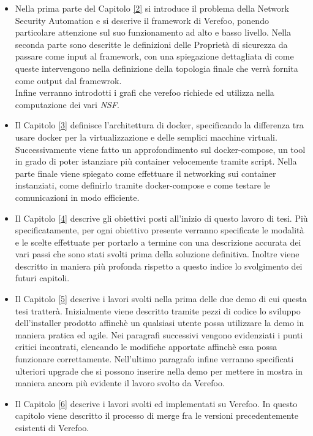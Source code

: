 \begin{itemize}
    \item Nella prima parte del Capitolo \hyperref[ch:verefoo]{[2]} si introduce il problema della Network Security Automation e si descrive il framework di Verefoo, ponendo particolare attenzione sul suo funzionamento ad alto e basso livello.
        Nella seconda parte sono descritte  le  definizioni delle Proprietà di sicurezza da passare come input al framework, con una spiegazione dettagliata
        di come queste intervengono nella definizione della topologia finale che verrà fornita come output dal framewrok. \\
        Infine verranno introdotti i grafi che verefoo richiede ed utilizza nella computazione dei vari \textit{NSF}.
    \item Il Capitolo \hyperref[ch:docker]{[3]} definisce l'architettura di docker, specificando la differenza tra usare docker per la virtualizzazione e delle semplici macchine virtuali. Successivamente
          viene fatto un approfondimento sul docker-compose, un tool in grado di poter istanziare più container velocemente tramite script. Nella parte finale viene spiegato come effettuare il networking
          sui container instanziati, come definirlo tramite docker-compose e come testare le comunicazioni in modo efficiente.
    \item Il Capitolo \hyperref[ch:ThesisObj]{[4]} descrive gli obiettivi posti all'inizio di questo lavoro di tesi. Più specificatamente, per ogni obiettivo presente verranno specificate le modalità e le scelte effettuate per portarlo a termine con una descrizione accurata dei vari passi che sono stati svolti prima della soluzione definitiva.
          Inoltre viene descritto in maniera più profonda rispetto a questo indice lo svolgimento dei futuri capitoli.
    \item Il Capitolo \hyperref[ch:DemoA]{[5]} descrive i lavori svolti nella prima delle due demo di cui questa tesi tratterà. Inizialmente viene descritto tramite pezzi di codice lo sviluppo dell'installer prodotto affinchè un qualsiasi utente possa
          utilizzare la demo in maniera pratica ed agile. Nei paragrafi successivi vengono evidenziati i punti critici incontrati, elencando le modifiche apportate affinchè essa possa funzionare correttamente.
          Nell'ultimo paragrafo infine verranno specificati ulteriori upgrade che si possono inserire nella demo per mettere in mostra in maniera ancora più evidente il lavoro svolto da Verefoo.
    \item Il Capitolo \hyperref[ch:MergeChapter]{[6]} descrive i lavori svolti ed implementati su Verefoo. In questo capitolo viene descritto il processo di merge fra le versioni precedentemente esistenti di Verefoo.

\end{itemize}

